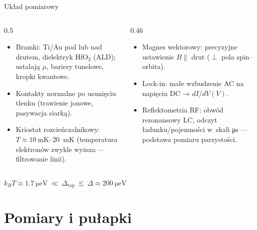 \documentclass[aspectratio=169,10pt]{beamer}
\begin{document}
\begin{frame}{Układ pomiarowy}
  \begin{columns}[T]
    \begin{column}{0.5\textwidth}
      \begin{itemize}
        \item \alert{Bramki}: Ti/Au pod lub nad drutem, dielektryk HfO$_2$ (ALD);
              ustalają $\mu$, bariery tunelowe, kropki kwantowe.
        \item \alert{Kontakty} normalne po usunięciu tlenku (trawienie jonowe, pasywacja siarką).
        \item \alert{Kriostat rozcieńczalnikowy}: $T\approx\qty{10}{\milli\kelvin}$–\qty{20}{\milli\kelvin}
              (temperatura elektronów zwykle wyższa — filtrowanie linii).
      \end{itemize}
    \end{column}
    \begin{column}{0.46\textwidth}
      \begin{itemize}
        \item \alert{Magnes wektorowy}: precyzyjne ustawienie $B\parallel$ drut
              ($\perp$ pola spin–orbita).
        \item \alert{Lock-in}: małe wzbudzenie AC na napięciu DC → $dI/dV(V)$.
        \item \alert{Reflektometria RF}: obwód rezonansowy LC, odczyt ładunku/pojemności
              w~skali \unit{\micro\second} — podstawa pomiaru parzystości.
      \end{itemize}
    \end{column}
  \end{columns}
  \vspace{2mm}
  \centering
  $k_BT \approx \qty{1.7}{\micro\electronvolt}\ \ll\ \Delta_\mathrm{top}\ \lesssim\ \Delta\approx\qty{200}{\micro\electronvolt}$
\end{frame}

\section{Pomiary i pułapki}
\end{document}
